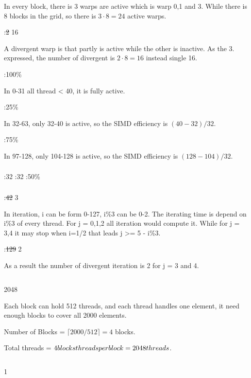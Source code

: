 \documentclass{article}
\begin{document}
In every block, there is 3 warps are active which is warp 0,1 and 3.
While there is 8 blocks in the grid, so there is \(3\cdot8=24\) active warps.

:\sout{2} 16

A divergent warp is that partly is active while the other is inactive.
As the 3. expressed, the number of divergent is \(2\cdot8=16\) instead single 16.

:100\%

In 0-31 all thread < 40, it is fully active.

:25\%

In 32-63, only 32-40 is active, so the SIMD efficiency is \((40-32)/32\).

:75\%

In 97-128, only 104-128 is active, so the SIMD efficiency is \((128-104)/32\).

\subsubsection{}
:32
:32
:50\%

\subsubsection{}
:\sout{42} 3

In iteration, i can be form 0-127, i\%3 can be 0-2. The iterating time is depend on i\%3 of every thread. For j = 0,1,2 all iteration would compute it. While for j = 3,4 it may stop when i=1/2 that leads j >= 5 - i\%3.


:\sout{129} 2

As a result the number of divergent iteration is 2 for j = 3 and 4.

\subsection{}
2048

Each block can hold 512 threads, and each thread handles one element, it need enough blocks to cover all 2000 elements.

Number of Blocks = \(\lceil2000/512\rceil = 4\) blocks.

Total threads = \(4 blocks \time 512threads per block = 2048 threads\).

\subsection{}
1
\end{document}
